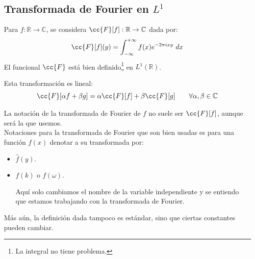 \subsection{Transformada de Fourier en $L^1$}
\noindent
Para $f:\mathbb{R}\to\mathbb{C}$, se considera $\cc{F}[f]:\mathbb{R}\to \mathbb{C}$ dada por:
\begin{equation*}
    \cc{F}[f](y) = \int_{-\infty}^{+\infty} f(x)e^{-2\pi i x y}~dx 
\end{equation*}
El funcional $\cc{F}$ está bien definido\footnote{La integral no tiene problema.} en $L^1(\mathbb{R})$.\\

\begin{observacion}
Esta transformación es lineal:
\begin{equation*}
    \cc{F}[\alpha f + \beta g] = \alpha\cc{F}[f] + \beta\cc{F}[g] \qquad \forall \alpha,\beta\in \mathbb{C}
\end{equation*}
\end{observacion}

\begin{notacion}
    La notación de la transformada de Fourier de $f$ no suele ser $\cc{F}[f]$, aunque será la que usemos.\\

    \noindent
    Notaciones para la transformada de Fourier que son bien usadas es para una función $f(x)$ denotar a su transformada por:
    \begin{itemize}
        \item $\hat{f}(y)$.
        \item $f(k)$ o $f(\omega)$.

            Aquí solo cambiamos el nombre de la variable independiente y se entiendo que estamos trabajando con la transformada de Fourier.
    \end{itemize}
    Más aún, la definición dada tampoco es estándar, sino que ciertas constantes pueden cambiar.
\end{notacion}

